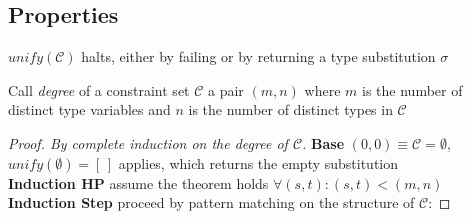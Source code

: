 \documentclass[8pt]{beamer}
\begin{document}
\subsection{Properties}

\begin{frame}
    \begin{theorem}
        $unify(\mathcal{C})$ halts, either by failing or by returning a type 
        substitution $\sigma$
    \end{theorem}
    \footnotesize
    Call \emph{degree} of a constraint set $\mathcal{C}$ a pair $(m,n)$ where
    $m$ is the number of distinct type variables and $n$ is the number of
    distinct types in $\mathcal{C}$
    \begin{proof}[Proof. By complete induction on the degree of $\mathcal{C}$]
    \textbf{Base} $(0,0) \equiv \mathcal{C} = \emptyset$, 
        $unify(\emptyset) = [\,]$ applies, which returns the empty substitution\\
    \textbf{Induction HP} assume the theorem holds 
        $\forall (s,t): (s,t) < (m,n)$ \\
    \textbf{Induction Step} proceed by pattern matching on the 
        structure of $\mathcal{C}$: 
\end{proof}
\end{frame}
\end{document}
